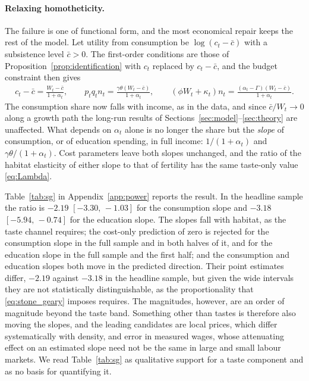 \documentclass[11pt]{article}
\begin{document}
\paragraph{Relaxing homotheticity.}
The failure is one of functional form, and the most economical repair keeps the rest of the model.
Let utility from consumption be $\log(c_t-\bar c)$ with a subsistence level $\bar c>0$. The
first-order conditions are those of Proposition~\ref{prop:identification} with $c_t$ replaced by
$c_t-\bar c$, and the budget constraint then gives
\begin{align}
c_t-\bar c=\frac{W_t-\bar c}{1+\alpha_t},
\qquad
p_tq_tn_t=\frac{\gamma\theta\left(W_t-\bar c\right)}{1+\alpha_t},
\qquad
\left(\phi W_t+\kappa_t\right)n_t=\frac{\left(\alpha_t-\Gamma\right)\left(W_t-\bar c\right)}{1+\alpha_t}.
\label{eq:stone_geary}
\end{align}
The consumption share now falls with income, as in the data, and since $\bar c/W_t\to0$ along a
growth path the long-run results of Sections~\ref{sec:model}--\ref{sec:theory} are
unaffected. What depends on $\alpha_t$ alone is no longer the share but the \emph{slope} of
consumption, or of education spending, in full income: $1/(1+\alpha_t)$ and
$\gamma\theta/(1+\alpha_t)$. Cost parameters leave both slopes unchanged, and the ratio of the
habitat elasticity of either slope to that of fertility has the same taste-only value
\eqref{eq:Lambda}.



Table~\ref{tab:sg} in Appendix~\ref{app:power} reports the result. In the headline sample the ratio is
$-2.19$ $[-3.30,\,-1.03]$ for the consumption slope and $-3.18$ $[-5.94,\,-0.74]$ for the education
slope. The slopes fall with habitat, as the taste channel
requires; the cost-only prediction of zero is rejected for the consumption slope in the full sample
and in both halves of it, and for the education slope in the full sample and the first half; and
the consumption and education slopes both move in the predicted direction. Their point
estimates differ, $-2.19$ against $-3.18$ in the headline sample, but given the wide intervals they are
not statistically distinguishable, as the proportionality that \eqref{eq:stone_geary} imposes
requires. The magnitudes, however, are an
order of magnitude beyond the taste band. Something other than tastes is therefore also moving the
slopes, and the leading candidates are local prices, which differ systematically with density, and
error in measured wages, whose attenuating effect on an estimated slope need not be the same in
large and small labour markets. We read Table~\ref{tab:sg} as qualitative support for a taste
component and as no basis for quantifying it.
\end{document}
